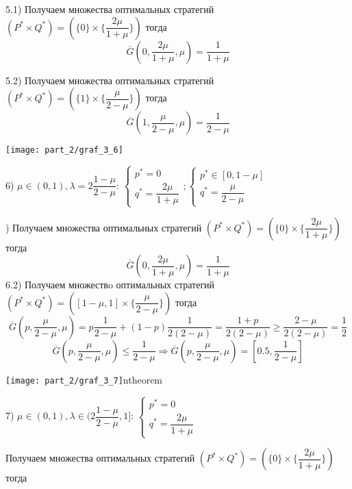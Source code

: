 \hfill \break

5.1) Получаем множества оптимальных стратегий 
$(P^* \times Q^*) = (\{0\} \times \{\dfrac{2\mu}{1 + \mu}\})$ тогда
$$
	\overline G(0, \dfrac{2\mu}{1 + \mu}, \mu) = \dfrac{1}{1 + \mu}
$$

5.2) Получаем множества оптимальных стратегий 
$(P^* \times Q^*) =(\{1\}\times \{\dfrac{\mu}{2 - \mu}\})$ тогда
$$
	\overline G(1, \dfrac{\mu}{2 - \mu}, \mu) = \dfrac{1}{2 - \mu}
$$

\begin{center}
\texttt{[image: part\_2/graf\_3\_6]}
\end{center}

6) $\mu \in (0, 1), \lambda = 2\dfrac{1 - \mu}{2 - \mu}$: 
$
	\begin{cases}
		p^* = 0 \\
		q^* = \dfrac{2\mu}{1 + \mu}
	\end{cases};
	\begin{cases}
		p^* \in [0, 1 - \mu] \\
		q^* = \dfrac{\mu}{2 - \mu} 
	\end{cases}
$

\hfill {}) Получаем множества оптимальных стратегий 
$(P^* \times Q^*) =(\{0\} \times \{\dfrac{2\mu}{1 + \mu}\})$ тогда
$$
	\overline G(0, \dfrac{2\mu}{1 + \mu}, \mu) = \dfrac{1}{1 + \mu}
$$
6.2) Получаем множествo оптимальных стратегий 
$(P^* \times Q^*) =([1 - \mu, 1] \times \{\dfrac{\mu}{2 - \mu}\})$ тогда
$$
	\overline G(p, \dfrac{\mu}{2 - \mu}, \mu) =
	p\dfrac{1}{2 - \mu} + (1 - p)\dfrac{1}{2(2 - \mu)} =
	\dfrac{1 + p}{2(2 - \mu)} \geqslant \dfrac{2 - \mu}{2(2 - \mu)} =
	\dfrac{1}{2}
$$
$$
	\overline G(p, \dfrac{\mu}{2 - \mu}, \mu) \leqslant
 	\dfrac{1}{2 - \mu} \Rightarrow \overline G(p, \dfrac{\mu}{2 - \mu}, \mu) =
 	[0.5, \dfrac{1}{2 - \mu}]
$$

\begin{center}
\texttt{[image: part\_2/graf\_3\_7]}ntheorem
\end{center}

7) $\mu \in (0, 1), \lambda \in (2\dfrac{1 - \mu}{2 - \mu}, 1]$: 
$
	\begin{cases}
		p^* = 0 \\
		q^* = \dfrac{2\mu}{1 + \mu}
	\end{cases}
$

\hfill \break

Получаем множества оптимальных стратегий 
$(P^* \times Q^*) =(\{0\} \times \{\dfrac{2\mu}{1 + \mu}\})$ тогда

